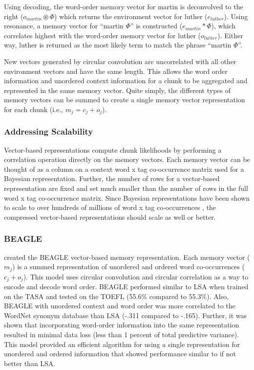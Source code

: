 \documentclass[man,floatsintext,donotrepeattitle]{apa6}
\begin{document}
Using decoding, the word-order memory vector for martin is deconvolved to the right ($o_{martin} \circledast \Phi$) which returns the environment vector for luther ($e_{luther}$).
Using resonance, a memory vector for ``martin $\Phi$'' is constructed ($e_{martin} * \Phi$), which correlates highest with the word-order memory vector for luther ($o_{luther}$).
Either way, luther is returned as the most likely term to match the phrase ``martin $\Phi$''.

New vectors generated by circular convolution are uncorrelated with all other environment vectors and have the same length.
This allows the word order information and unordered context information for a chunk to be aggregated and represented in the same memory vector.
Quite simply, the different types of memory vectors can be summed to create a single memory vector representation for each chunk (i.e., $m_{j} = c_{j} + o_{j}$).

\subsubsection{Addressing Scalability}

Vector-based representations compute chunk likelihoods by performing a correlation operation directly on the memory vectors.
Each memory vector can be thought of as a column on a context word x tag co-occurrence matrix used for a Bayesian representation.
Further, the number of rows for a vector-based representation are fixed and set much smaller than the number of rows in the full word x tag co-occurrence matrix.
Since Bayesian representations have been shown to scale to over hundreds of millions of word x tag co-occurrences \parencite{Stanley2013}, the compressed vector-based representations should scale as well or better.

\subsubsection{BEAGLE}

\textcite{Jones2007} created the BEAGLE vector-based memory representation.
Each memory vector ($m_{j}$) is a summed representation of unordered and ordered word co-occurrences ($c_{j} + o_{j}$).
This model uses circular convolution and circular correlation as a way to encode and decode word order.
BEAGLE performed similar to LSA when trained on the TASA and tested on the TOEFL (55.6\% compared to 55.3\%).
Also, BEAGLE with unordered context and word order was more correlated to the WordNet synonym database than LSA (-.311 compared to -.165).
Further, it was shown that incorporating word-order information into the same representation resulted in minimal data loss (less than 1 percent of total predictive variance).
This model provided an efficient algorithm for using a single representation for unordered and ordered information that showed performance similar to if not better than LSA.
\end{document}
